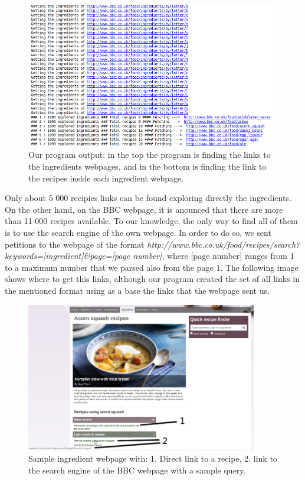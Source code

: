\documentclass[paper=a4, fontsize=11pt]{scrartcl} %
\numberwithin{equation}{section} %
\numberwithin{figure}{section} %
\numberwithin{table}{section} %
\begin{document}
\begin{figure}[H]
\centering
\includegraphics[width=1\textwidth]{images/downloadslinks}
\caption{Our program output: in the top the program is finding the links to the ingredients webpages, and in the bottom is finding the link to the recipes inside each ingredient webpage.}
\end{figure}

Only about 5 000 recipies links can be found exploring directly the ingredients. On the other hand, on the BBC webpage, it is anounced that there are more than 11 000 recipes available. To our knowledge, the only way to find all of them is to use the search engine of the own webpage. In order to do so, we sent petitions to the webpage of the format \textit{http://www.bbc.co.uk/food/recipes/search?keywords=[ingredient]\&page=[page number]}, where [page number] ranges from 1 to a maximum number that we parsed also from the page 1. The following image shows where to get this links, although our program created the set of all links in the mentioned format using as a base the links that the webpage sent us.

\begin{figure}[H]
\centering
\includegraphics[width=0.9\textwidth]{images/ingredient}
\caption{Sample ingredient webpage with: 1. Direct link to a recipe, 2. link to the search engine of the BBC webpage with a sample query.}
\end{figure}
\end{document}
